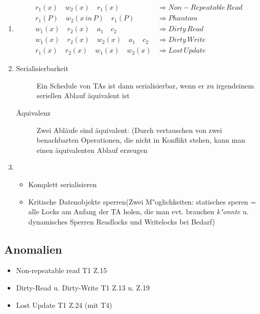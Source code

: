 \documentclass[a4paper, 12pt]{scrartcl}
\begin{document}
\begin{enumerate}
	\item
		\begin{align*}
			r_1(x) \quad w_2(x) \quad r_1(x) &\Rightarrow Non-Repeatable\, Read\\
			r_1(P) \quad w_2(x\, in\, P) \quad r_1(P) &\Rightarrow Phantom\\
			w_1(x) \quad r_2(x) \quad a_1 \quad c_2 &\Rightarrow Dirty\, Read\\
			w_1(x) \quad r_2(x) \quad w_2(x) \quad a_1 \quad c_2 &\Rightarrow Dirty\, Write\\
			r_1(x) \quad r_2(x) \quad w_1(x) \quad w_2(x) &\Rightarrow Lost\, Update
		\end{align*}

	\item
		\begin{description}
			\item[Serialisierbarkeit] Ein Schedule von TAs ist dann serialisierbar, wenn er zu irgendeinem seriellen Ablauf äquivalent ist
			\item[Äquivalenz]Zwei Abläufe sind äquivalent: (Durch vertauschen von zwei benachbarten Operationen, die nicht in Konflikt stehen, kann man einen äquivalenten Ablauf erzeugen
		\end{description}
	\item
		\begin{itemize}
			\item
			 Komplett serialisieren
		 \item
			 Kritische Datenobjekte sperren(Zwei M"oglichkeiten: statisches speren = alle Locks am Anfang der TA holen, die man evt. brauchen \emph{k"onnte} u. dynamisches Sperren Readlocks und Writelocks bei Bedarf)
		\end{itemize}
\end{enumerate}


\subsection{Anomalien}
\begin{itemize}
	\item
		Non-repeatable read T1 Z.15
	\item
		Dirty-Read u. Dirty-Write T1 Z.13 u. Z.19
	\item
		Lost Update T1 Z.24 (mit T4)
\end{itemize}
\end{document}
